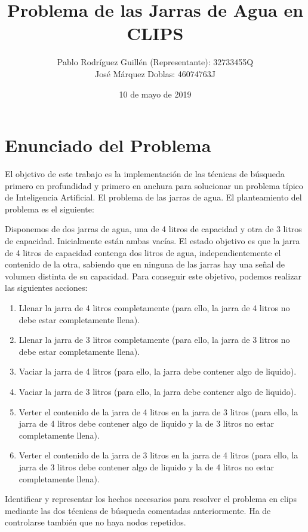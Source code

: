\documentclass[11pt,a4paper,final]{article}
\author{Pablo Rodríguez Guillén (Representante): 32733455Q \\
		José Márquez Doblas: 46074763J}
\title{\textbf{Problema de las Jarras de Agua en CLIPS}}
\date{10 de mayo de 2019}
\begin{document}
\maketitle
\tableofcontents
\newpage

\section{Enunciado del Problema}
El objetivo de este trabajo es la implementación de las técnicas de búsqueda primero en profundidad y primero en anchura para solucionar un problema típico de Inteligencia Artificial. El problema de las jarras de agua. El planteamiento del problema es el siguiente:

Disponemos de dos jarras de agua, una de 4 litros de capacidad y otra de 3 litros de capacidad. Inicialmente están ambas vacías. El estado objetivo es que la jarra de 4 litros de capacidad contenga dos litros de agua, independientemente el contenido de la otra, sabiendo que en ninguna de las jarras hay una señal de volumen distinta de su capacidad. Para conseguir este objetivo, podemos realizar las siguientes acciones:

\begin{enumerate}
	\item Llenar la jarra de 4 litros completamente (para ello, la jarra de 4 litros no debe estar completamente llena).
	\item Llenar la jarra de 3 litros completamente (para ello, la jarra de 3 litros no debe estar completamente llena).
	\item Vaciar la jarra de 4 litros (para ello, la jarra debe contener algo de liquido).
	\item Vaciar la jarra de 3 litros (para ello, la jarra debe contener algo de liquido).
	\item Verter el contenido de la jarra de 4 litros en la jarra de 3 litros (para ello, la jarra de 4 litros debe contener algo de liquido y la de 3 litros no estar completamente llena).
	\item Verter el contenido de la jarra de 3 litros en la jarra de 4 litros (para ello, la jarra de 3 litros debe contener algo de liquido y la de 4 litros no estar completamente llena).
\end{enumerate}

Identificar y representar los hechos necesarios para resolver el problema en clips mediante las dos técnicas de búsqueda comentadas anteriormente. Ha de controlarse también que no haya nodos repetidos.
\end{document}
